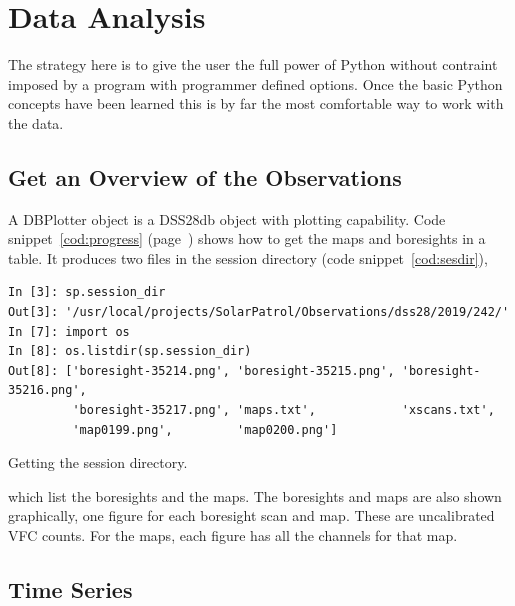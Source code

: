 \documentclass[letterpaper,11pt]{report}
\begin{document}
\section{Data Analysis}

The strategy here is to give the user the full power of Python without contraint
imposed by a program with programmer defined options.  Once the basic Python
concepts have been learned this is by far the most comfortable way to work with
the data.

\subsection{Get an Overview of the Observations}\label{sec:overview}

A {\ttfamily DBPlotter} object is a {\ttfamily DSS28db} object with plotting
capability.  Code snippet~\ref{cod:progress} (page~\pageref{cod:progress})
shows how to get the maps and boresights in a table.  It produces two
files in the session directory (code snippet~\ref{cod:sesdir}),
\begin{code}[h!tb]
    \begin{center}
        {\scriptsize \begin{verbatim}
In [3]: sp.session_dir
Out[3]: '/usr/local/projects/SolarPatrol/Observations/dss28/2019/242/'
In [7]: import os
In [8]: os.listdir(sp.session_dir)
Out[8]: ['boresight-35214.png', 'boresight-35215.png', 'boresight-35216.png',  
         'boresight-35217.png', 'maps.txt',            'xscans.txt',         
         'map0199.png',         'map0200.png']
\end{verbatim}
        }\caption{\label{cod:sesdir}Getting the session directory.}
    \end{center}
\end{code}
which list the boresights and the maps. The boresights and maps are also
shown graphically, one figure for each boresight scan and map. These are 
uncalibrated VFC counts. For the maps, each figure has all the channels for that
map.

\subsection{Time Series}
\end{document}

